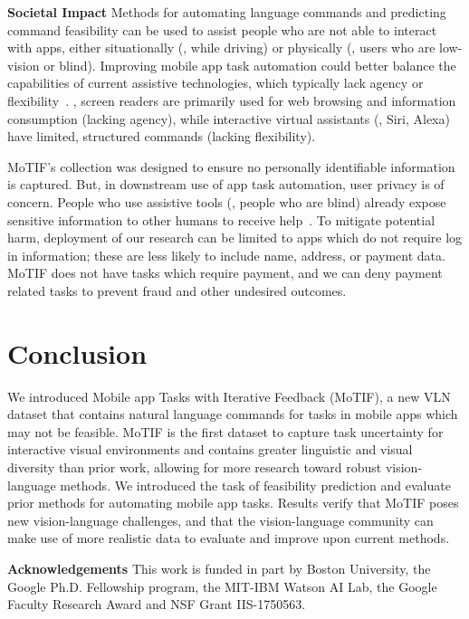 \smallskip
\noindent\textbf{Societal Impact}
Methods for automating language commands and predicting command feasibility can be used to assist people who are not able to interact with apps, either situationally (\eg, while driving) or physically (\eg, users who are low-vision or blind). Improving mobile app task automation could better balance the capabilities of current assistive technologies, which typically lack agency or flexibility~\cite{screenreader}. \Eg, screen readers are primarily used for web browsing and information consumption (lacking agency), while interactive virtual assistants (\eg, Siri, Alexa) have limited, structured commands (lacking flexibility). 

MoTIF's collection was designed to ensure no personally identifiable information is captured. But, in downstream use of app task automation, user privacy is of concern. People who use assistive tools (\eg, people who are blind) already expose sensitive information to other humans to receive help~\cite{visprivacy,Akter2020IAU}. To mitigate potential harm, deployment of our research can be limited to apps which do not require log in information; these are less likely to include name, address, or payment data. MoTIF does not have tasks which require payment, and we can deny payment related tasks to prevent fraud and other undesired outcomes. 

\section{Conclusion}
\label{sec:conc}
We introduced Mobile app Tasks with Iterative Feedback (MoTIF), a new VLN dataset that contains natural language commands for tasks in mobile apps which may not be feasible. MoTIF is the first dataset to capture task uncertainty for interactive visual environments and contains greater linguistic and visual diversity than prior work, allowing for more research toward robust vision-language methods. We introduced the task of feasibility prediction and evaluate prior methods for automating mobile app tasks. Results verify that MoTIF poses new vision-language challenges, and that the vision-language community can make use of more realistic data to evaluate and improve upon current methods.

\smallskip
\noindent\textbf{Acknowledgements} This work is funded in part by Boston University, the Google Ph.D. Fellowship program, the MIT-IBM Watson AI Lab, the Google Faculty Research Award and NSF Grant IIS-1750563.


